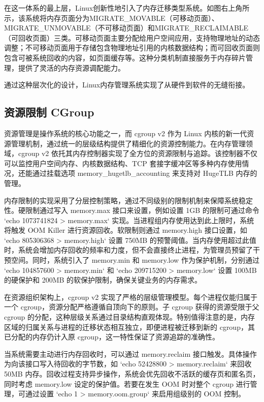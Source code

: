 在这一体系的最上层，Linux创新性地引入了内存迁移类型系统。如图右上角所示，该系统将内存页面分为MIGRATE\_MOVABLE（可移动页面）、MIGRATE\_UNMOVABLE（不可移动页面）和MIGRATE\_RECLAIMABLE（可回收页面）三类。可移动页面主要分配给用户空间应用，支持物理地址的动态调整；不可移动页面用于存储包含物理地址引用的内核数据结构；而可回收页面则包含可被系统回收的内容，如页面缓存等。这种分类机制直接服务于内存碎片管理，提供了灵活的内存资源调配能力。

通过这种层次化的设计，Linux内存管理系统实现了从硬件到软件的无缝衔接。

\subsection{资源限制 CGroup}






资源管理是操作系统的核心功能之一，而 cgroup v2 作为 Linux 内核的新一代资源管理机制，通过统一的层级结构提供了精细化的资源控制能力。在内存管理领域，cgroup v2 依托其内存控制器实现了全方位的资源限制与追踪。该控制器不仅可以监控用户空间内存、内核数据结构、TCP 套接字缓冲区等多种内存使用情况，还能通过挂载选项 memory\_hugetlb\_accounting 来支持对 HugeTLB 内存的管理。

内存限制的实现采用了分层控制策略，通过不同级别的限制机制来保障系统稳定性。硬限制通过写入 memory.max 接口来设置，例如设置 1GB 的限制可通过命令 `echo 1073741824 > memory.max` 实现。当进程组内存使用达到此上限时，系统将触发 OOM Killer 进行资源回收。软限制则通过 memory.high 接口设置，如 `echo 805306368 > memory.high` 设置 750MB 的预警阈值。当内存使用超过此值时，系统会增加内存回收的频率和力度，但不会直接终止进程，为管理员预留了干预空间。同时，系统引入了 memory.min 和 memory.low 作为保护机制，分别通过 `echo 104857600 > memory.min` 和 `echo 209715200 > memory.low` 设置 100MB 的硬保护和 200MB 的软保护限制，确保关键业务的内存需求。

在资源组织架构上，cgroup v2 实现了严格的层级管理模型。每个进程仅能归属于一个 cgroup，资源分配严格遵循自顶向下的原则。子 cgroup 获得的资源受限于父 cgroup 的分配，这种层级关系通过目录结构直观体现。特别值得注意的是，内存区域的归属关系与进程的迁移状态相互独立，即便进程被迁移到新的 cgroup，其已分配的内存仍计入原 cgroup，这一特性保证了资源追踪的准确性。

当系统需要主动进行内存回收时，可以通过 memory.reclaim 接口触发。具体操作为向该接口写入待回收的字节数，如 `echo 52428800 > memory.reclaim` 来回收 50MB 内存。回收过程支持异步操作，系统会优先回收不活跃的缓存页和匿名页，同时考虑 memory.low 设定的保护值。若要在发生 OOM 时对整个 cgroup 进行管理，可通过设置 `echo 1 > memory.oom.group` 来启用组级别的 OOM 控制。

